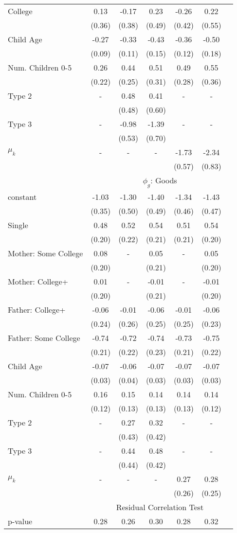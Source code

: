 \begin{tabular}{lcccccc}
College&0.13&-0.17&0.23&-0.26&0.22&\\&(0.36)&(0.38)&(0.49)&(0.42)&(0.55)&\\Child Age&-0.27&-0.33&-0.43&-0.36&-0.50&\\&(0.09)&(0.11)&(0.15)&(0.12)&(0.18)&\\Num. Children 0-5&0.26&0.44&0.51&0.49&0.55&\\&(0.22)&(0.25)&(0.31)&(0.28)&(0.36)&\\Type 2&-&0.48&0.41&-&-&\\&&(0.48)&(0.60)&&&\\Type 3&-&-0.98&-1.39&-&-&\\&&(0.53)&(0.70)&&&\\$\mu_{k}$&-&-&-&-1.73&-2.34&\\&&&&(0.57)&(0.83)&\\& \multicolumn{6}{c}{$\phi_{g}$: Goods}\\\cmidrule(r){2-7}constant&-1.03&-1.30&-1.40&-1.34&-1.43&\\&(0.35)&(0.50)&(0.49)&(0.46)&(0.47)&\\Single&0.48&0.52&0.54&0.51&0.54&\\&(0.20)&(0.22)&(0.21)&(0.21)&(0.20)&\\Mother: Some College&0.08&-&0.05&-&0.05&\\&(0.20)&&(0.21)&&(0.20)&\\Mother: College+&0.01&-&-0.01&-&-0.01&\\&(0.20)&&(0.21)&&(0.20)&\\Father: College+&-0.06&-0.01&-0.06&-0.01&-0.06&\\&(0.24)&(0.26)&(0.25)&(0.25)&(0.23)&\\Father: Some College&-0.74&-0.72&-0.74&-0.73&-0.75&\\&(0.21)&(0.22)&(0.23)&(0.21)&(0.22)&\\Child Age&-0.07&-0.06&-0.07&-0.07&-0.07&\\&(0.03)&(0.04)&(0.03)&(0.03)&(0.03)&\\Num. Children 0-5&0.16&0.15&0.14&0.14&0.14&\\&(0.12)&(0.13)&(0.13)&(0.13)&(0.12)&\\Type 2&-&0.27&0.32&-&-&\\&&(0.43)&(0.42)&&&\\Type 3&-&0.44&0.48&-&-&\\&&(0.44)&(0.42)&&&\\$\mu_{k}$&-&-&-&0.27&0.28&\\&&&&(0.26)&(0.25)&\\& \multicolumn{6}{c}{Residual Correlation Test}\\\cmidrule(r){2-7}p-value&0.28&0.26&0.30&0.28&0.32&\\
\bottomrule\end{tabular}